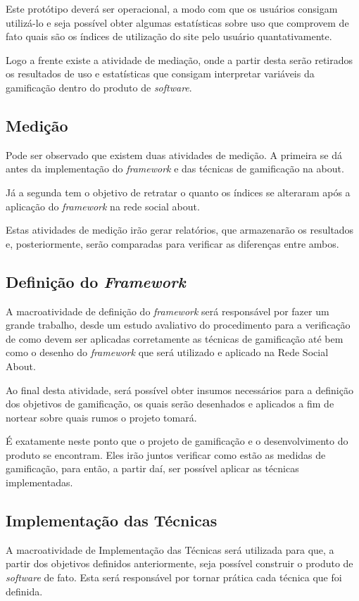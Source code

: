 Este protótipo deverá ser operacional, a modo com que os usuários consigam
utilizá-lo e seja possível obter algumas estatísticas sobre uso que comprovem
de fato quais são os índices de utilização do site pelo usuário quantativamente.

Logo a frente existe a atividade de mediação, onde a partir desta serão retirados
os resultados de uso e estatísticas que consigam interpretar variáveis da gamificação
dentro do produto de \textit{software}. 

\subsection{Medição}
\label{sub:medicao}
Pode ser observado que existem duas atividades de medição. A primeira se dá
antes da implementação do \textit{framework}  e das técnicas de gamificação na about.

Já a segunda tem o objetivo de retratar o quanto os índices se alteraram após
a aplicação do \textit{framework} na rede social about.

Estas atividades de medição irão gerar relatórios, que armazenarão os resultados
e, posteriormente, serão comparadas para verificar as diferenças entre ambos.

\subsection{Definição do \textit{Framework}}
\label{sub:definicaoframework}
A macroatividade de definição do \textit{framework} será responsável por fazer um grande
trabalho, desde um estudo avaliativo do procedimento para a verificação de como
devem ser aplicadas corretamente as técnicas de gamificação até bem como o desenho
do \textit{framework} que será utilizado e aplicado na Rede Social About.

Ao final desta atividade, será possível obter insumos necessários para a definição
dos objetivos de gamificação, os quais serão desenhados e aplicados a fim
de nortear sobre quais rumos o projeto tomará.

É exatamente neste ponto que o projeto de gamificação e o desenvolvimento do produto
se encontram. Eles irão juntos verificar como estão as medidas de gamificação, para
então, a partir daí, ser possível aplicar as técnicas implementadas.

\subsection{Implementação das Técnicas}
\label{sub:implematationtechnics}
A macroatividade de Implementação das Técnicas será utilizada para que, a partir
dos objetivos definidos anteriormente, seja possível construir o produto de \textit{software}
de fato. Esta será responsável por tornar prática
cada técnica que foi definida.

